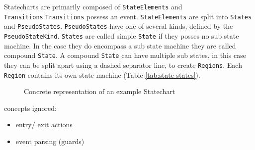 Statecharts are primarily composed of \texttt{StateElements} and \texttt{Transitions}.\texttt{Transitions} possess an event. 
\texttt{StateElements} are split into \texttt{States} and \texttt{PseudoStates}. \texttt{PseudoStates} have one of several kinds, defined by the \texttt{PseudoStateKind}. \texttt{States} are called simple \texttt{State} if they posses no sub state machine. In the case they do encompass a sub state machine they are called compound \texttt{State}. A compound \texttt{State} can have multiple sub states, in this case they can be split apart using a dashed separator line, to create \texttt{Regions}. Each \texttt{Region} contains its own state machine (Table \ref{tab:state-states}).


\begin{figure}
\centering

\caption{Concrete representation of an example Statechart}
\label{fig:statechart-example}
\end{figure}

concepts ignored:
\begin{itemize}
  \item entry/ exit actions
  \item event parsing (guards)
\end{itemize}
